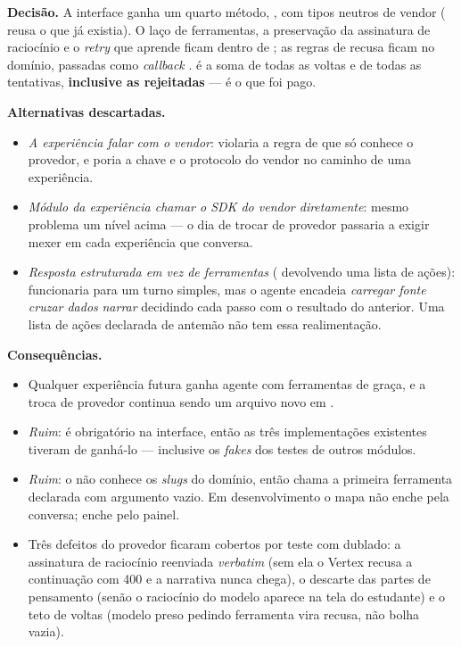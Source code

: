 \textbf{Decisão.} A interface ganha um quarto método, , com tipos
neutros de vendor ( reusa o  que já existia). O
laço de ferramentas, a preservação da assinatura de raciocínio e o \emph{retry}
que aprende ficam dentro de ; as regras de recusa ficam
no domínio, passadas como \emph{callback} .  é a
soma de todas as voltas e de todas as tentativas, \textbf{inclusive as
rejeitadas} --- é o que foi pago.

\textbf{Alternativas descartadas.}
\begin{itemize}
  \item \emph{A experiência falar com o vendor}: violaria a regra de que só
     conhece o provedor, e poria a chave e o protocolo do vendor no
    caminho de uma experiência.
  \item \emph{Módulo da experiência chamar o SDK do vendor diretamente}: mesmo
    problema um nível acima --- o dia de trocar de provedor passaria a exigir
    mexer em cada experiência que conversa.
  \item \emph{Resposta estruturada em vez de ferramentas} (
    devolvendo uma lista de ações): funcionaria para um turno simples, mas o
    agente encadeia \emph{carregar fonte} \seta{} \emph{cruzar dados} \seta{}
    \emph{narrar} decidindo cada passo com o resultado do anterior. Uma lista de
    ações declarada de antemão não tem essa realimentação.
\end{itemize}

\textbf{Consequências.}
\begin{itemize}
  \item Qualquer experiência futura ganha agente com ferramentas de graça, e a
    troca de provedor continua sendo um arquivo novo em .
  \item \emph{Ruim}:  é obrigatório na interface, então as três
    implementações existentes tiveram de ganhá-lo --- inclusive os \emph{fakes}
    dos testes de outros módulos.
  \item \emph{Ruim}: o  não conhece os \emph{slugs} do domínio,
    então chama a primeira ferramenta declarada com argumento vazio. Em
    desenvolvimento o mapa não enche pela conversa; enche pelo painel.
  \item Três defeitos do provedor ficaram cobertos por teste com 
    dublado: a assinatura de raciocínio reenviada \emph{verbatim} (sem ela o
    Vertex recusa a continuação com 400 e a narrativa nunca chega), o descarte
    das partes de pensamento (senão o raciocínio do modelo aparece na tela do
    estudante) e o teto de voltas (modelo preso pedindo ferramenta vira recusa, não
    bolha vazia).
\end{itemize}


